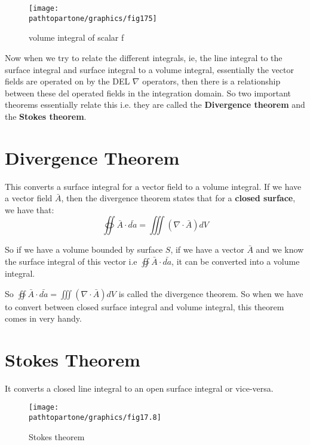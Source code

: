 \begin{figure}
\centering
\texttt{[image: \\pathtopartone/graphics/fig175]}
\caption{volume integral of scalar f}
\label{fig:page-8}
\end{figure}

Now when we try to relate the different integrals, ie, the line integral to the surface integral and surface integral to a volume integral, essentially the vector fields are operated on by the DEL $\nabla$ operators, then there is a relationship between these del operated fields in the integration domain. So two important theorems essentially relate this i.e. they are called the \textbf{Divergence theorem} and the \textbf{Stokes theorem}.

\section{Divergence Theorem}
This converts a surface integral for a vector field to a volume integral. If we have a vector field $\bar{A}$, then the divergence theorem states that for a \textbf{closed surface}, we have that:
\begin{equation}
\oiint \bar{A} \cdot \bar{da} = \iiint (\nabla \cdot \bar{A})dV
\end{equation}


So if we have a volume bounded by surface $S$, if we have a vector $\bar{A}$ and we know the surface integral of this vector i.e $\oiint \bar{A}\cdot\bar{da}$, it can be converted into a volume integral.


So $\oiint \bar{A} \cdot \bar{da} = \iiint (\nabla \cdot \bar{A})dV$ is called the divergence theorem. So when we have to convert between closed surface integral and volume integral, this theorem comes in very handy.

\section{Stokes Theorem}
It converts a closed line integral to an open surface integral or vice-versa.


\begin{figure}
\centering
\texttt{[image: \\pathtopartone/graphics/fig17.8]}
\caption{Stokes theorem}
\end{figure}

